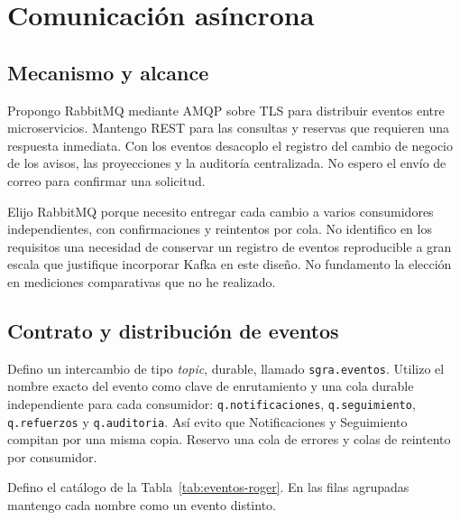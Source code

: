 \section{Comunicación asíncrona}
\subsection{Mecanismo y alcance}

Propongo RabbitMQ mediante AMQP sobre TLS para distribuir eventos entre
microservicios. Mantengo REST para las consultas y reservas que requieren
una respuesta inmediata. Con los eventos desacoplo el registro del cambio
de negocio de los avisos, las proyecciones y la auditoría centralizada.
No espero el envío de correo para confirmar una solicitud.

Elijo RabbitMQ porque necesito entregar cada cambio a varios consumidores
independientes, con confirmaciones y reintentos por cola. No identifico en
los requisitos una necesidad de conservar un registro de eventos reproducible
a gran escala que justifique incorporar Kafka en este diseño. No fundamento
la elección en mediciones comparativas que no he realizado.

\subsection{Contrato y distribución de eventos}

Defino un intercambio de tipo \textit{topic}, durable, llamado
\texttt{sgra.eventos}. Utilizo el nombre exacto del evento como clave de
enrutamiento y una cola durable independiente para cada consumidor:
\texttt{q.notificaciones}, \texttt{q.seguimiento}, \texttt{q.refuerzos}
y \texttt{q.auditoria}. Así evito que Notificaciones y Seguimiento compitan
por una misma copia. Reservo una cola de errores y colas de reintento
por consumidor.

Defino el catálogo de la Tabla~\ref{tab:eventos-roger}. En las filas
agrupadas mantengo cada nombre como un evento distinto.

